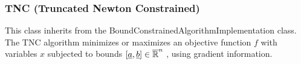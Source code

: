 

\newpage
\subsubsection{TNC (Truncated Newton Constrained)}

This class inherits from the BoundConstrainedAlgorithmImplementation class.\\

The TNC algorithm minimizes or maximizes an objective function $f$ with variables $x$ subjected to bounds $[{\underline{a}},{\underline{b}}] \in \overline{{\mathbb R}}^n$ , using gradient information.

